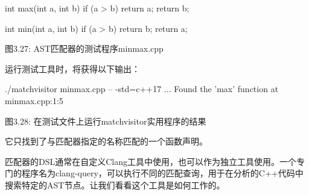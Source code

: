 \begin{cpp}
int max(int a, int b) {
  if (a > b) return a;
    return b;
}

int min(int a, int b) {
  if (a > b) return b;
    return a;
}
\end{cpp}

\begin{center}
图3.27: AST匹配器的测试程序minmax.cpp
\end{center}

运行测试工具时，将获得以下输出：

\begin{shell}
./matchvisitor minmax.cpp -- -std=c++17
...
Found the 'max' function at minmax.cpp:1:5
\end{shell}

\begin{center}
图3.28: 在测试文件上运行matchvisitor实用程序的结果
\end{center}

它只找到了与匹配器指定的名称匹配的一个函数声明。

匹配器的DSL通常在自定义Clang工具中使用，也可以作为独立工具使用。一个专门的程序名为clang-query，可以执行不同的匹配查询，用于在分析的C++代码中搜索特定的AST节点。让我们看看这个工具是如何工作的。










































